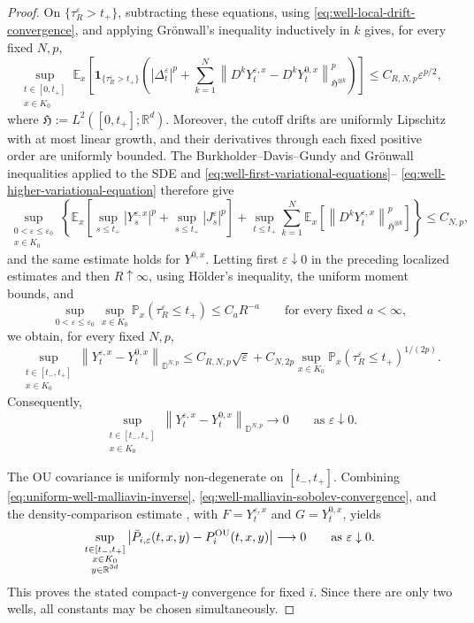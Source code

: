 \documentclass[11pt]{article}
\numberwithin{equation}{section}
\theoremstyle{plain}
\theoremstyle{definition}
\theoremstyle{remark}
\newcommand{\R}{\mathbb R}
\newcommand{\eps}{\varepsilon}
\newcommand{\E}{\mathbb E}
\newcommand{\Pbb}{\mathbb P}
\begin{document}
\begin{proof}
On $\{\tau_R^\eps>t_+\}$, subtracting these equations, using
\eqref{eq:well-local-drift-convergence}, and applying Gr\"onwall's inequality
inductively in $k$ gives, for every fixed $N,p$,
\begin{equation}
\label{eq:well-local-malliavin-difference}
\sup_{\substack{t\in[0,t_+]\\x\in K_0}}
\E_x\!\left[\mathbf1_{\{\tau_R^\eps>t_+\}}
\left(
|\Delta_t^\eps|^p
+\sum_{k=1}^N
\left\|D^kY_t^{\eps,x}-D^kY_t^{0,x}\right\|_{\mathfrak H^{\otimes k}}^p
\right)\right]
\le C_{R,N,p}\eps^{p/2},
\end{equation}
where $\mathfrak H:=L^2([0,t_+];\R^d)$.  Moreover, the cutoff drifts are
uniformly Lipschitz with at most linear growth, and their derivatives through
each fixed positive order are uniformly bounded.  The
Burkholder--Davis--Gundy and Gr\"onwall inequalities applied to the SDE and
\eqref{eq:well-first-variational-equations}--
\eqref{eq:well-higher-variational-equation} therefore give
\begin{equation}
\label{eq:well-uniform-variational-moments}
\sup_{\substack{0<\eps\le\eps_0\\x\in K_0}}
\left\{
\E_x\!\left[\sup_{s\le t_+}|Y_s^{\eps,x}|^p
             +\sup_{s\le t_+}|J_s^\eps|^p\right]
+\sup_{t\le t_+}\sum_{k=1}^N
\E_x\!\left[\left\|D^kY_t^{\eps,x}\right\|_{\mathfrak H^{\otimes k}}^p\right]
\right\}
\le C_{N,p},
\end{equation}
and the same estimate holds for $Y^{0,x}$.
Letting first $\eps\downarrow0$ in
the preceding localized estimates and then $R\uparrow\infty$, using H\"older's
inequality, the uniform moment bounds, and
\[
\sup_{0<\eps\le\eps_0}\sup_{x\in K_0}
\Pbb_x\left(\tau_R^\eps\le t_+\right)\le C_aR^{-a}
\qquad\text{for every fixed }a<\infty,
\]
we obtain, for every fixed $N,p$,
\[
\sup_{\substack{t\in[t_-,t_+]\\x\in K_0}}
\left\|Y_t^{\eps,x}-Y_t^{0,x}\right\|_{\mathbb D^{N,p}}
\le C_{R,N,p}\sqrt\eps
+C_{N,2p}
\sup_{x\in K_0}\Pbb_x(\tau_R^\eps\le t_+)^{1/(2p)}.
\]
Consequently,
\begin{equation}
\label{eq:well-malliavin-sobolev-convergence}
\sup_{\substack{t\in[t_-,t_+]\\x\in K_0}}
\left\|Y_t^{\eps,x}-Y_t^{0,x}\right\|_{\mathbb D^{N,p}}
\longrightarrow0
\qquad\text{as $\eps\downarrow0$}.
\end{equation}

The OU covariance is uniformly non-degenerate on $[t_-,t_+]$.  Combining
\eqref{eq:uniform-well-malliavin-inverse},
\eqref{eq:well-malliavin-sobolev-convergence}, and the density-comparison
estimate \cite[Appendix~A, equation~(A.2)]{Pigato2022}, with
$F=Y_t^{\eps,x}$ and $G=Y_t^{0,x}$, yields
\[
\sup_{\substack{t\in[t_-,t_+]\\x\in K_0\\y\in\R^{3d}}}
\left|\bar P_{i,\eps}(t,x,y)-P_i^{\rm OU}(t,x,y)\right|
\longrightarrow0
\qquad\text{as $\eps\downarrow0$}.
\]
This proves the stated compact-$y$ convergence for fixed $i$.  Since there
are only two wells, all constants may be chosen simultaneously.
\end{proof}
\end{document}
